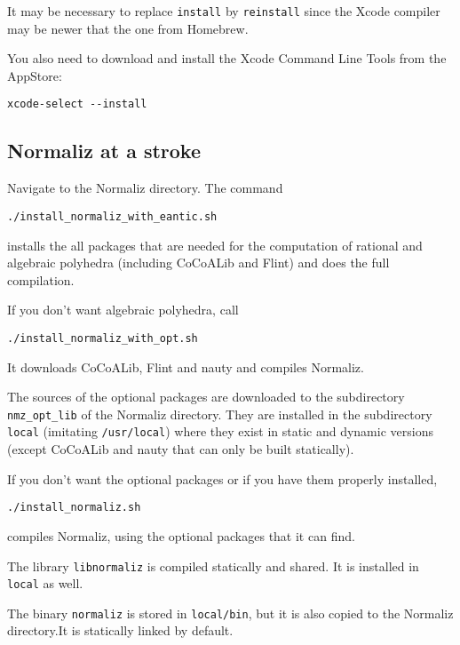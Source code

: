 \documentclass[12pt,a4paper]{scrartcl}
\theoremstyle{definition}
\begin{document}
It may be necessary to replace \verb|install| by \verb|reinstall| since the Xcode compiler may be newer that the one from Homebrew.

You also need to download and install the Xcode Command Line Tools from the AppStore:
\begin{Verbatim}
xcode-select --install
\end{Verbatim}

\subsection{Normaliz at a stroke}\label{stroke}

Navigate to the Normaliz directory. The command
\begin{Verbatim}
./install_normaliz_with_eantic.sh
\end{Verbatim}
installs the all packages that are needed for the computation of rational and algebraic polyhedra (including CoCoALib and Flint) and does the full compilation.

If you don't want algebraic polyhedra, call
\begin{Verbatim}
./install_normaliz_with_opt.sh
\end{Verbatim}
It downloads CoCoALib, Flint and nauty and compiles Normaliz.

The sources of the optional packages are downloaded to the subdirectory \verb|nmz_opt_lib| of the Normaliz directory. They are installed in the subdirectory \verb|local| (imitating \verb|/usr/local|) where they exist in static and dynamic versions (except CoCoALib and nauty that can only be built statically).

If you don't want the optional packages or if you have them properly installed,
\begin{Verbatim}
./install_normaliz.sh
\end{Verbatim}
compiles Normaliz, using the optional packages that it can find.

The library \verb|libnormaliz| is compiled statically and shared. It is installed in \verb|local| as well.

The binary \verb|normaliz| is stored in \verb|local/bin|, but it is also copied to the Normaliz directory.It is statically linked by default.
\end{document}
